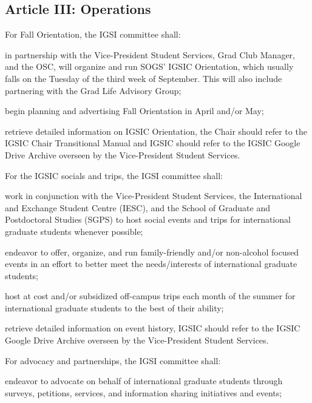 \subsection{Article III: Operations}
\begin{longenum}[ label*=\thesubsection.\arabic*., align=left] 
\item For Fall Orientation, the IGSI committee shall:
	\begin{longenum}[ label*=\arabic*., align=left]
	\item in partnership with the Vice-President Student Services, Grad Club Manager, and the OSC, will organize and run SOGS’ IGSIC Orientation, which usually falls on the Tuesday of the third week of September. This will also include partnering with the Grad Life Advisory Group;
	\item begin planning and advertising Fall Orientation in April and/or May;
	\item retrieve detailed information on IGSIC Orientation, the Chair should refer to the IGSIC Chair Transitional Manual and IGSIC should refer to the IGSIC Google Drive Archive overseen by the Vice-President Student Services.
	\end{longenum}
\item For the IGSIC socials and trips, the IGSI committee shall:
	\begin{longenum}[ label*=\arabic*., align=left]
	\item work in conjunction with the Vice-President Student Services, the International and Exchange Student Centre (IESC), and the School of Graduate and Postdoctoral Studies (SGPS) to host social events and trips for international graduate students whenever possible;
	\item endeavor to offer, organize, and run family-friendly and/or non-alcohol focused events in an effort to better meet the needs/interests of international    graduate students;
	\item host at cost and/or subsidized off-campus trips each month of the summer for international graduate students to the best of their ability;
	\item retrieve detailed information on event history, IGSIC should refer to the IGSIC Google Drive Archive overseen by the Vice-President Student Services.
	\end{longenum}
\item For advocacy and partnerships, the IGSI committee shall:
	\begin{longenum}[ label*=\arabic*., align=left]
	\item endeavor to advocate on behalf of international graduate students through surveys, petitions, services, and information sharing initiatives and events;

\end{longenum}
\end{longenum}
